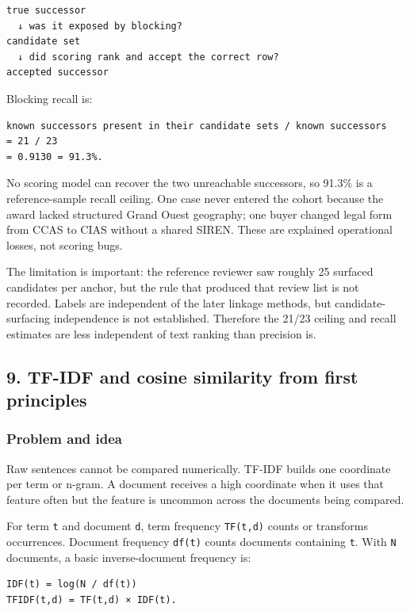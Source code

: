 \begin{verbatim}
true successor
  ↓ was it exposed by blocking?
candidate set
  ↓ did scoring rank and accept the correct row?
accepted successor
\end{verbatim}

Blocking recall is:

\begin{verbatim}
known successors present in their candidate sets / known successors
= 21 / 23
= 0.9130 = 91.3%.
\end{verbatim}

No scoring model can recover the two unreachable successors, so 91.3\%
is a reference-sample recall ceiling. One case never entered the cohort
because the award lacked structured Grand Ouest geography; one buyer
changed legal form from CCAS to CIAS without a shared SIREN. These are
explained operational losses, not scoring bugs.

The limitation is important: the reference reviewer saw roughly 25
surfaced candidates per anchor, but the rule that produced that review
list is not recorded. Labels are independent of the later linkage
methods, but candidate-surfacing independence is not established.
Therefore the 21/23 ceiling and recall estimates are less independent of
text ranking than precision is.

\subsection{9. TF-IDF and cosine similarity from first
principles}\label{9-tf-idf-and-cosine-similarity-from-first-principles}

\subsubsection{Problem and idea}\label{problem-and-idea-1}

Raw sentences cannot be compared numerically. TF-IDF builds one
coordinate per term or n-gram. A document receives a high coordinate
when it uses that feature often but the feature is uncommon across the
documents being compared.

For term \texttt{t} and document \texttt{d}, term frequency
\texttt{TF(t,d)} counts or transforms occurrences. Document frequency
\texttt{df(t)} counts documents containing \texttt{t}. With \texttt{N}
documents, a basic inverse-document frequency is:

\begin{verbatim}
IDF(t) = log(N / df(t))
TFIDF(t,d) = TF(t,d) × IDF(t).
\end{verbatim}

